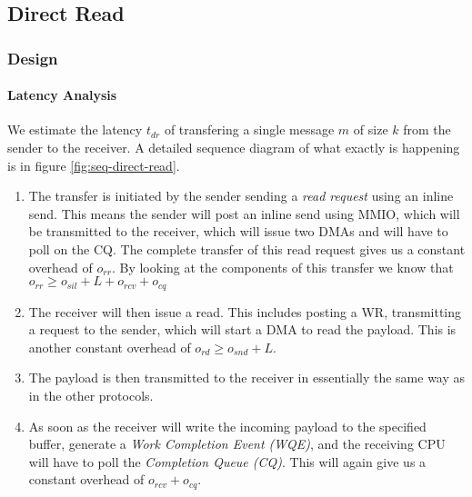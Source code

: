 
\subsection{Direct Read}
\subsubsection{Design}

\paragraph{Latency Analysis}

We estimate the latency $t_{dr}$ of transfering a single message $m$ of size $k$ from the sender to the receiver. 
A detailed sequence diagram of what exactly is happening is in figure \ref{fig:seq-direct-read}. 

\begin{enumerate}
  \item The transfer is initiated by the sender sending a \emph{read request} using an inline send. This means the sender
    will post an inline send using MMIO, which will be transmitted to the receiver, which will issue two DMAs and will have
    to poll on the CQ. The complete transfer of this read request gives us a constant overhead of $o_{rr}$. By looking at the
    components of this transfer we know that $o_{rr} \geq o_{sil} + L + o_{rcv} + o_{cq}$
  \item The receiver will then issue a read. This includes posting a WR, transmitting a request to the sender, which will start
    a DMA to read the payload. This is another constant overhead of $o_{rd} \geq o_{snd} + L$.
  \item The payload is then transmitted to the receiver in essentially the same way as in the other protocols.
  \item As soon as the receiver will write the incoming payload to the specified buffer, generate a 
    \emph{Work Completion Event (WQE)}, and the receiving CPU will have to poll the \emph{Completion Queue (CQ)}. 
    This will again give us a constant overhead of $o_{rcv} + o_{cq}$. 
\end{enumerate}



